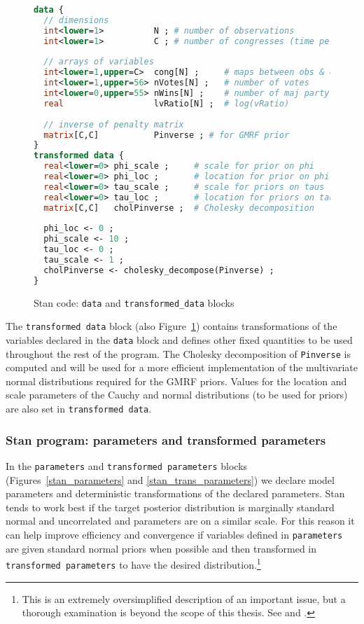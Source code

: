\begin{figure}[h]
\begin{lstlisting}[language=Stan, frame=trBL]
data {
  // dimensions 
  int<lower=1>          N ; # number of observations 
  int<lower=1>          C ; # number of congresses (time periods)
  
  // arrays of variables 
  int<lower=1,upper=C>  cong[N] ;     # maps between obs & congress
  int<lower=1,upper=56> nVotes[N] ;   # number of votes
  int<lower=0,upper=55> nWins[N] ;    # number of maj party victories
  real                  lvRatio[N] ;  # log(vRatio)
  
  // inverse of penalty matrix 
  matrix[C,C]           Pinverse ; # for GMRF prior
}
transformed data {
  real<lower=0> phi_scale ;     # scale for prior on phi
  real<lower=0> phi_loc ;       # location for prior on phi
  real<lower=0> tau_scale ;     # scale for priors on taus
  real<lower=0> tau_loc ;       # location for priors on taus
  matrix[C,C]   cholPinverse ;  # Cholesky decomposition 
  
  phi_loc <- 0 ;
  phi_scale <- 10 ;
  tau_loc <- 0 ;
  tau_scale <- 1 ;
  cholPinverse <- cholesky_decompose(Pinverse) ;
}
\end{lstlisting}
\caption{Stan code: {\tt data} and {\tt transformed\_data} blocks}
\label{stan_data}
\end{figure}



The {\tt transformed data} block (also Figure~\ref{stan_data}) contains transformations of the 
variables declared in the {\tt data} block and defines other fixed quantities to be used throughout 
the rest of the program. The Cholesky decomposition of {\tt Pinverse} is computed and will be used 
for a more efficient implementation of the multivariate normal distributions required for the GMRF 
priors. Values for the location and scale parameters of the Cauchy and normal distributions 
(to be used for priors) are also set in {\tt transformed data}. 


\subsubsection{Stan program: parameters and transformed parameters}

In the {\tt parameters} and {\tt transformed parameters} blocks (Figures~\ref{stan_parameters} 
and \ref{stan_trans_parameters}) we declare model parameters and deterministic transformations 
of the declared parameters. Stan tends to work best if the target posterior distribution is marginally 
standard normal and uncorrelated and parameters are on a similar scale. For this reason it can help 
improve efficiency and convergence if variables defined in {\tt parameters} are given standard normal 
priors when possible and then transformed in {\tt transformed parameters} to have the desired 
distribution.\footnote{This is an extremely oversimplified description of an important issue, but 
a thorough examination is beyond the scope of this thesis. See  
and .} 

